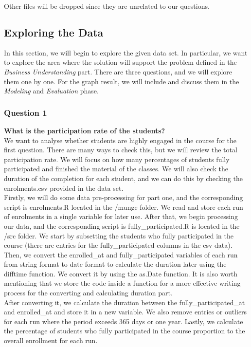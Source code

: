 \documentclass[12pt,]{article}
\begin{document}
\noindent Other files will be dropped since they are unrelated to our
questions.

\hypertarget{exploring-the-data}{%
\subsection{Exploring the Data}\label{exploring-the-data}}

In this section, we will begin to explore the given data set. In
particular, we want to explore the area where the solution will support
the problem defined in the \emph{Business Understanding} part. There are
three questions, and we will explore them one by one. For the graph
result, we will include and discuss them in the \emph{Modeling} and
\emph{Evaluation} phase.

\hypertarget{question-1}{%
\subsubsection{Question 1}\label{question-1}}

\textbf{What is the participation rate of the students?}\\
\hfill\break We want to analyse whether students are highly engaged in
the course for the first question. There are many ways to check this,
but we will review the total participation rate. We will focus on how
many percentages of students fully participated and finished the
material of the classes. We will also check the duration of the
completion for each student, and we can do this by checking the
enrolments.csv provided in the data set.\\
\hfill\break Firstly, we will do some data pre-processing for part one,
and the corresponding script is enrolments.R located in the /munge
folder. We read and store each run of enrolments in a single variable
for later use. After that, we begin processing our data, and the
corresponding script is fully\_participated.R is located in the /src
folder. We start by subsetting the students who fully participated in
the course (there are entries for the fully\_participated columns in the
csv data). Then, we convert the enrolled\_at and fully\_participated
variables of each run from string format to date format to calculate the
duration later using the difftime function. We convert it by using the
as.Date function. It is also worth mentioning that we store the code
inside a function for a more effective writing process for the
converting and calculating duration part.\\
\hfill\break After converting it, we calculate the duration between the
fully\_participated\_at and enrolled\_at and store it in a new variable.
We also remove entries or outliers for each run where the period exceeds
365 days or one year. Lastly, we calculate the percentage of students
who fully participated in the course proportion to the overall
enrollment for each run.
\end{document}
